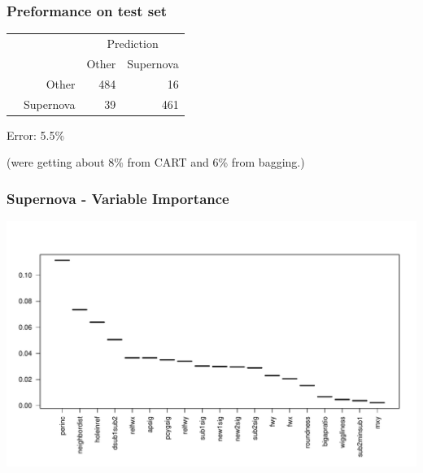 \documentclass{beamer}
\begin{document}
\begin{frame}
	\frametitle{Preformance on test set}
	\begin{table}
	\begin{tabular}{cr|rr}
	& & \multicolumn{2}{c}{Prediction}\\
	& & Other & Supernova\\
	\hline
	\multirow{2}{*}{\rotatebox{90}{Actual}} & Other &  484 &  16\\
	& Supernova & 39 &  461\\
	\end{tabular}
	\end{table}
	Error: 5.5\%
	
	(were getting about 8\% from CART and 6\% from bagging.)
\end{frame}

\begin{frame}
	\frametitle{Supernova - Variable Importance}
	\includegraphics{imp.pdf}
\end{frame}
\end{document}
